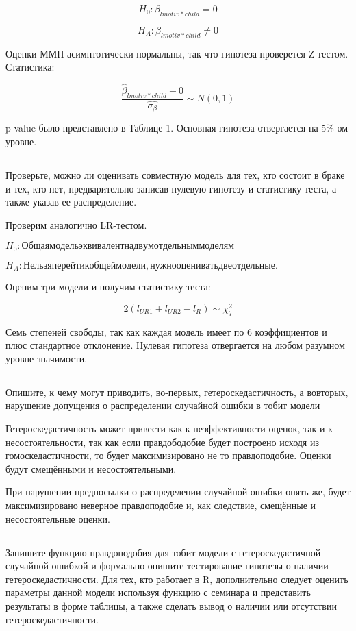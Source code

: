 \documentclass[a4paper,12pt]{article}
\begin{document}
\[  H_0: \beta_{lmotiv*child} = 0  \]

\[ H_A: \beta_{lmotiv*child} \neq 0  \]

Оценки ММП асимптотически нормальны, так что гипотеза проверется Z-тестом.  Статистика:

\[ \frac{\hat{\beta}_{lmotiv*child} - 0 }{\hat{\sigma_\beta}} \sim N(0,1)\]

p-value было представлено в Таблице 1. Основная гипотеза отвергается на 5\%-ом уровне.

\subsection{}
\Sun Проверьте, можно ли оценивать совместную модель для тех, кто состоит в браке
и тех, кто нет, предварительно записав нулевую гипотезу и статистику теста, а также указав
ее распределение.

Проверим аналогично LR-тестом. 

$ H_0: Общая модель эквивалентна двум отдельным моделям $

$ H_A: Нельзя перейти к общей модели, нужно оценивать две отдельные. $

Оценим три модели и получим статистику теста:

\[ 2(l_{UR1} + l_{UR2} - l_R) \sim \chi^2_7 \]

Семь степеней свободы, так как каждая модель имеет по 6 коэффициентов и плюс стандартное отклонение. Нулевая гипотеза отвергается на любом разумном уровне значимости.
\subsection{}

\Sun  Опишите, к чему могут приводить, во-первых, гетероскедастичность, а вовторых, нарушение допущения о распределении случайной ошибки в тобит модели


Гетероскедастичность может привести как к неэффективности оценок, так и к несостоятельности, так как если правдободобие будет построено исходя из гомоскедастичности, то будет максимизировано не то правдоподобие. Оценки будут смещёнными и несостоятельными.

При нарушении предпосылки о распределении случайной ошибки опять же, будет максимизировано неверное правдоподобие и, как следствие, смещённые и несостоятельные оценки.

\subsection{}
 Запишите функцию правдоподобия для тобит модели с гетероскедастичной
случайной ошибкой и формально опишите тестирование гипотезы о наличии
гетероскедастичности. Для тех, кто работает в R, дополнительно следует оценить
параметры данной модели используя функцию с семинара и представить результаты в
форме таблицы, а также сделать вывод о наличии или отсутствии гетероскедастичности.
\end{document}
